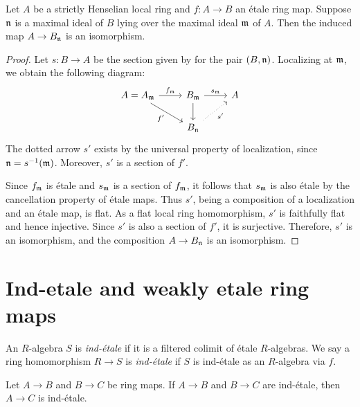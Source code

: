 \begin{proposition}
    \label{thm:etale-over-strictly-henselian-localization-isom}
    Let \(A\) be a strictly Henselian local ring and \(f : A \to B\) an étale ring map. Suppose \({\mathfrak{n}}\) is a maximal ideal of \(B\) lying over the maximal ideal \({\mathfrak{m}}\) of \(A\). Then the induced map \(A \to B_{\mathfrak{n}}\) is an isomorphism.
\end{proposition}

\begin{proof}
  Let \(s: B \to A\) be the section given by  for the pair \((B, {\mathfrak{n}})\). Localizing at \({\mathfrak{m}}\), we obtain the following diagram:
  \[
  \begin{tikzcd}
    A = A_\m \arrow[r, "f_\m"]\arrow[dr, "f'"'] & B_\m \arrow[d] \arrow[r, "s_\m"] & A \\
    & B_\n \arrow[ur, dotted, "s'"'] &
  \end{tikzcd}
  \]
  The dotted arrow \(s'\) exists by the universal property of localization, since \({\mathfrak{n}} = s^{-1}({\mathfrak{m}})\). Moreover, \(s'\) is a section of \(f'\).

  Since \(f_{\mathfrak{m}}\) is étale and \(s_{\mathfrak{m}}\) is a section of \(f_{\mathfrak{m}}\), it follows that \(s_{\mathfrak{m}}\) is also étale by the cancellation property of étale maps. Thus \(s'\), being a composition of a localization and an étale map, is flat. As a flat local ring homomorphism, \(s'\) is faithfully flat and hence injective. Since \(s'\) is also a section of \(f'\), it is surjective. Therefore, \(s'\) is an isomorphism, and the composition \(A \to B_{\mathfrak{n}}\) is an isomorphism.
\end{proof}

\section{Ind-etale and weakly etale ring maps}

\begin{definition}
    An $R$-algebra $S$ is \emph{ind-étale} if it is a filtered colimit of étale $R$-algebras.
    We say a ring homomorphism $R \to S$ is \emph{ind-étale} if $S$ is ind-étale as an $R$-algebra via $f$.
    \label{def:ind-etale}
\end{definition}

\begin{lemma}
  \label{thm:ind-etale-comp}
  Let $A \to B$ and $B \to C$ be ring maps. If $A \to B$ and $B \to C$ are ind-étale, then $A \to C$ is ind-étale.
\end{lemma}

